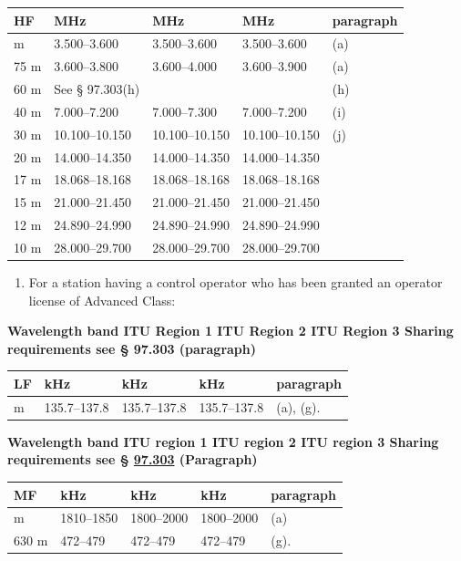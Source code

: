 \documentclass[
  letterpaper,
  DIV=11,
  numbers=noendperiod]{scrreport}
\providecommand{\tightlist}{%
  \setlength{\itemsep}{0pt}\setlength{\parskip}{0pt}}\usepackage{longtable,booktabs,array}
\begin{document}
\begin{longtable}[]{@{}lllll@{}}
\toprule\noalign{}
HF & MHz & MHz & MHz & paragraph \\
\midrule\noalign{}
\endhead
\bottomrule\noalign{}
\endlastfoot
80 m & 3.500--3.600 & 3.500--3.600 & 3.500--3.600 & (a) \\
75 m & 3.600--3.800 & 3.600--4.000 & 3.600--3.900 & (a) \\
60 m & See § 97.303(h) & & & (h) \\
40 m & 7.000--7.200 & 7.000--7.300 & 7.000--7.200 & (i) \\
30 m & 10.100--10.150 & 10.100--10.150 & 10.100--10.150 & (j) \\
20 m & 14.000--14.350 & 14.000--14.350 & 14.000--14.350 & \\
17 m & 18.068--18.168 & 18.068--18.168 & 18.068--18.168 & \\
15 m & 21.000--21.450 & 21.000--21.450 & 21.000--21.450 & \\
12 m & 24.890--24.990 & 24.890--24.990 & 24.890--24.990 & \\
10 m & 28.000--29.700 & 28.000--29.700 & 28.000--29.700 & \\
\end{longtable}

\begin{enumerate}
\def\labelenumi{(\alph{enumi})}
\setcounter{enumi}{2}
\tightlist
\item
  For a station having a control operator who has been granted an
  operator license of Advanced Class:
\end{enumerate}

\textbf{Wavelength band ITU Region 1 ITU Region 2 ITU Region 3 Sharing
requirements see § 97.303 (paragraph)}

\begin{longtable}[]{@{}lllll@{}}
\toprule\noalign{}
LF & kHz & kHz & kHz & paragraph \\
\midrule\noalign{}
\endhead
\bottomrule\noalign{}
\endlastfoot
2200 m & 135.7--137.8 & 135.7--137.8 & 135.7--137.8 & (a), (g). \\
\end{longtable}

\textbf{Wavelength band ITU region 1 ITU region 2 ITU region 3 Sharing
requirements see § \protect\hyperlink{97.303}{97.303} (Paragraph)}

\begin{longtable}[]{@{}lllll@{}}
\toprule\noalign{}
MF & kHz & kHz & kHz & paragraph \\
\midrule\noalign{}
\endhead
\bottomrule\noalign{}
\endlastfoot
160 m & 1810--1850 & 1800--2000 & 1800--2000 & (a) \\
630 m & 472--479 & 472--479 & 472--479 & (g). \\
\end{longtable}
\end{document}
